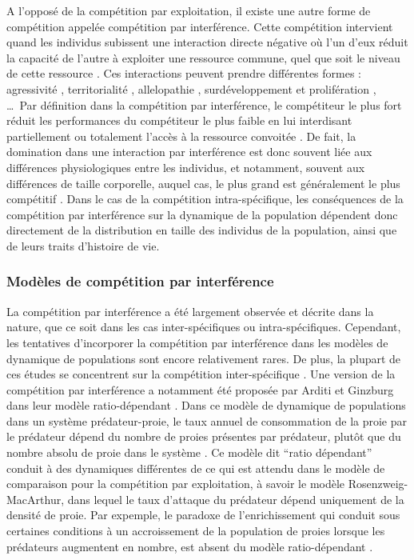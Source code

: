 A l'opposé de la compétition par exploitation, il existe une autre forme de
compétition appelée compétition par interférence. Cette compétition intervient
quand les individus subissent une interaction directe négative où l'un d'eux
réduit la capacité de l'autre à exploiter une ressource commune, quel que soit
le niveau de cette ressource \autocites{park1954a,vance1984a}. Ces interactions
peuvent prendre différentes formes : agressivité \autocites{schoener1976a},
territorialité \autocites{walls1990a,kennedy1996a}, allelopathie
\autocites{harper1977a,rice1984a,nilsson1994a}, surdéveloppement et prolifération
\autocites{connell1961a,paine1966a}, \ldots~Par définition dans la compétition
par interférence, le compétiteur le plus fort réduit les performances du
compétiteur le plus faible en lui interdisant
partiellement ou totalement l'accès à la ressource convoitée
\autocites{schoener1983a, thompson1993a}. De fait, la domination dans une
interaction par interférence est donc souvent liée aux différences
physiologiques entre les individus, et notamment, souvent aux différences de
taille corporelle, auquel cas, le plus grand est généralement le plus
compétitif \autocites{mccormick2012a}. Dans le cas de la compétition
intra-spécifique, les conséquences de la compétition par interférence sur la
dynamique de la population dépendent donc directement de la distribution en
taille des individus de la population, ainsi que de leurs traits d'histoire de
vie. 

\subsubsection{Modèles de compétition par interférence}

La compétition par interférence a été largement observée et décrite dans la
nature, que ce soit dans les cas inter-spécifiques ou intra-spécifiques.
Cependant, les tentatives d'incorporer la compétition par interférence dans les
modèles de dynamique de populations sont encore relativement rares. De plus, la
plupart de ces études se concentrent sur la compétition inter-spécifique
\autocites{case1974a, carothers1984a, vance1984a, adler2000a}. Une version de la
compétition par interférence a notamment été proposée par Arditi et Ginzburg
dans leur modèle ratio-dépendant \autocites{arditi1989a,arditi2012a,arditi1991a}.
Dans ce modèle de dynamique de populations dans un système prédateur-proie, le
taux annuel de consommation de la proie par le prédateur dépend du nombre de
proies présentes par prédateur, plutôt que du nombre absolu de proie dans le
système \autocite[voir][pour les détails et dérivations du modèle]{arditi2012a}.
Ce modèle dit ``ratio dépendant'' conduit à des dynamiques différentes de ce qui
est attendu dans le modèle de comparaison pour la compétition par exploitation,
à savoir le modèle Rosenzweig-MacArthur, dans lequel le taux d'attaque du
prédateur dépend uniquement de la densité de proie. Par expemple, le paradoxe de
l'enrichissement qui conduit sous certaines conditions à un accroissement de la
population de proies lorsque les prédateurs augmentent en nombre, est absent du
modèle ratio-dépendant \autocites{arditi2012a}. 


